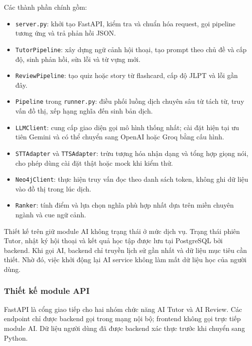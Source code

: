 \documentclass[../DoAn.tex]{subfiles}
\begin{document}
Các thành phần chính gồm:
\begin{itemize}
    \item \texttt{server.py}: khởi tạo FastAPI, kiểm tra và chuẩn hóa request, gọi pipeline tương ứng và trả phản hồi JSON.
    \item \texttt{TutorPipeline}: xây dựng ngữ cảnh hội thoại, tạo prompt theo chủ đề và cấp độ, sinh phản hồi, sửa lỗi và từ vựng mới.
    \item \texttt{ReviewPipeline}: tạo quiz hoặc story từ flashcard, cấp độ JLPT và lỗi gần đây.
    \item \texttt{Pipeline} trong \texttt{runner.py}: điều phối luồng dịch chuyên sâu từ tách từ, truy vấn đồ thị, xếp hạng nghĩa đến sinh bản dịch.
    \item \texttt{LLMClient}: cung cấp giao diện gọi mô hình thống nhất; cài đặt hiện tại ưu tiên Gemini và có thể chuyển sang OpenAI hoặc Groq bằng cấu hình.
    \item \texttt{STTAdapter} và \texttt{TTSAdapter}: trừu tượng hóa nhận dạng và tổng hợp giọng nói, cho phép dùng cài đặt thật hoặc mock khi kiểm thử.
    \item \texttt{Neo4jClient}: thực hiện truy vấn đọc theo danh sách token, không ghi dữ liệu vào đồ thị trong lúc dịch.
    \item \texttt{Ranker}: tính điểm và lựa chọn nghĩa phù hợp nhất dựa trên miền chuyên ngành và cue ngữ cảnh.
\end{itemize}

Thiết kế trên giữ module AI không trạng thái ở mức dịch vụ. Trạng thái phiên Tutor, nhật ký hội thoại và kết quả học tập được lưu tại PostgreSQL bởi backend. Khi gọi AI, backend chỉ truyền lịch sử gần nhất và dữ liệu mục tiêu cần thiết. Nhờ đó, việc khởi động lại AI service không làm mất dữ liệu học của người dùng.

\subsubsection{Thiết kế module API}

FastAPI là cổng giao tiếp cho hai nhóm chức năng AI Tutor và AI Review. Các endpoint chỉ được backend gọi trong mạng nội bộ; frontend không gọi trực tiếp module AI. Dữ liệu người dùng đã được backend xác thực trước khi chuyển sang Python.
\end{document}
